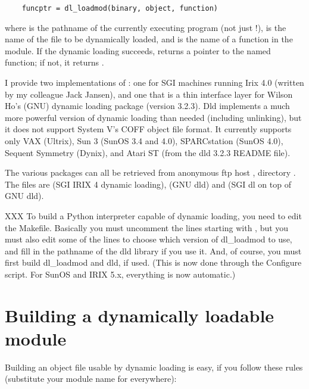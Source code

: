 \begin{verbatim}
    funcptr = dl_loadmod(binary, object, function)
\end{verbatim}

where  is the pathname of the currently executing program
(not just !),  is the name of the 
file to be dynamically loaded, and  is the name of a
function in the module.  If the dynamic loading succeeds,
 returns a pointer to the named function; if not, it
returns .

I provide two implementations of : one for SGI machines
running Irix 4.0 (written by my colleague Jack Jansen), and one that
is a thin interface layer for Wilson Ho's (GNU) dynamic loading
package  (version 3.2.3).  Dld implements a much more powerful
version of dynamic loading than needed (including unlinking), but it
does not support System V's COFF object file format.  It currently
supports only VAX (Ultrix), Sun 3 (SunOS 3.4 and 4.0), SPARCstation
(SunOS 4.0), Sequent Symmetry (Dynix), and Atari ST (from the dld
3.2.3 README file).

The various packages can all be retrieved from anonymous ftp host
, directory .  The files are
 (SGI IRIX 4 dynamic loading),
 (GNU dld) and  (SGI dl
on top of GNU dld).

XXX
To build a Python interpreter capable of dynamic loading, you need to
edit the Makefile.  Basically you must uncomment the lines starting
with , but you must also edit some of the lines to choose
which version of dl_loadmod to use, and fill in the pathname of the dld
library if you use it.  And, of course, you must first build
dl_loadmod and dld, if used.  (This is now done through the Configure
script.  For SunOS and IRIX 5.x, everything is now automatic.)


\section{Building a dynamically loadable module}

Building an object file usable by dynamic loading is easy, if you
follow these rules (substitute your module name for 
everywhere):

